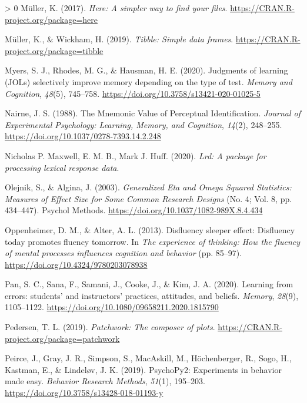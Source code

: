 \documentclass[
  english,
  jou]{apa7}
\newlength{\cslhangindent}
\newenvironment{CSLReferences}[3] %
 {%
  \setlength{\parindent}{0pt}
  \ifodd #1 \everypar{\setlength{\hangindent}{\cslhangindent}}\ignorespaces\fi
  \ifnum #2 > 0
  \setlength{\parskip}{#2\baselineskip}
  \fi
 }%
 {}
\begin{document}
\begin{CSLReferences}{1}{0}
\leavevmode\hypertarget{ref-R-here}{}%
Müller, K. (2017). \emph{Here: A simpler way to find your files}. \url{https://CRAN.R-project.org/package=here}

\leavevmode\hypertarget{ref-R-tibble}{}%
Müller, K., \& Wickham, H. (2019). \emph{Tibble: Simple data frames}. \url{https://CRAN.R-project.org/package=tibble}

\leavevmode\hypertarget{ref-Myers2020}{}%
Myers, S. J., Rhodes, M. G., \& Hausman, H. E. (2020). {Judgments of learning (JOLs) selectively improve memory depending on the type of test}. \emph{Memory and Cognition}, \emph{48}(5), 745--758. \url{https://doi.org/10.3758/s13421-020-01025-5}

\leavevmode\hypertarget{ref-Nairne1988}{}%
Nairne, J. S. (1988). {The Mnemonic Value of Perceptual Identification}. \emph{Journal of Experimental Psychology: Learning, Memory, and Cognition}, \emph{14}(2), 248--255. \url{https://doi.org/10.1037/0278-7393.14.2.248}

\leavevmode\hypertarget{ref-Maxwell2020}{}%
Nicholas P. Maxwell, E. M. B., Mark J. Huff. (2020). \emph{Lrd: A package for processing lexical response data}.

\leavevmode\hypertarget{ref-Olejnik2003}{}%
Olejnik, S., \& Algina, J. (2003). \emph{{Generalized Eta and Omega Squared Statistics: Measures of Effect Size for Some Common Research Designs}} (No. 4; Vol. 8, pp. 434--447). Psychol Methods. \url{https://doi.org/10.1037/1082-989X.8.4.434}

\leavevmode\hypertarget{ref-Oppenheimer2013}{}%
Oppenheimer, D. M., \& Alter, A. L. (2013). {Disfluency sleeper effect: Disfluency today promotes fluency tomorrow}. In \emph{The experience of thinking: How the fluency of mental processes influences cognition and behavior} (pp. 85--97). \url{https://doi.org/10.4324/9780203078938}

\leavevmode\hypertarget{ref-Pan2020}{}%
Pan, S. C., Sana, F., Samani, J., Cooke, J., \& Kim, J. A. (2020). {Learning from errors: students' and instructors' practices, attitudes, and beliefs}. \emph{Memory}, \emph{28}(9), 1105--1122. \url{https://doi.org/10.1080/09658211.2020.1815790}

\leavevmode\hypertarget{ref-R-patchwork}{}%
Pedersen, T. L. (2019). \emph{Patchwork: The composer of plots}. \url{https://CRAN.R-project.org/package=patchwork}

\leavevmode\hypertarget{ref-Peirce2019}{}%
Peirce, J., Gray, J. R., Simpson, S., MacAskill, M., Höchenberger, R., Sogo, H., Kastman, E., \& Lindeløv, J. K. (2019). {PsychoPy2: Experiments in behavior made easy}. \emph{Behavior Research Methods}, \emph{51}(1), 195--203. \url{https://doi.org/10.3758/s13428-018-01193-y}


\end{CSLReferences}
\end{document}
